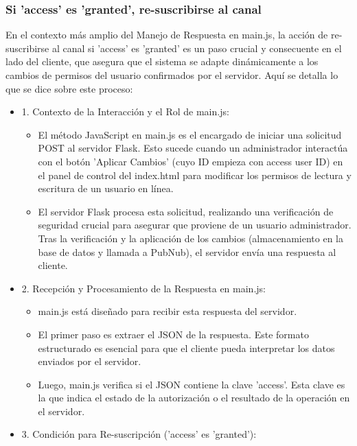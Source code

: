 \documentclass{report}
\begin{document}
\subsubsection{Si 'access' es 'granted', re-suscribirse al canal}
En el contexto más amplio del Manejo de Respuesta en main.js, la acción de re-suscribirse al canal si 'access' es 'granted' es un paso crucial y 
consecuente en el lado del cliente, que asegura que el sistema se adapte dinámicamente a los cambios de permisos del usuario confirmados por el servidor.
Aquí se detalla lo que se dice sobre este proceso:
\begin{itemize}
    \item 1. Contexto de la Interacción y el Rol de main.js:
        \begin{itemize}
            \item El método JavaScript en main.js es el encargado de iniciar una solicitud POST al servidor Flask. Esto sucede cuando un 
            administrador interactúa con el botón 'Aplicar Cambios' (cuyo ID empieza con access user ID) en el panel de control del index.html 
            para modificar los permisos de lectura y escritura de un usuario en línea.
            \item El servidor Flask procesa esta solicitud, realizando una verificación de seguridad crucial para asegurar que proviene de un 
            usuario administrador. Tras la verificación y la aplicación de los cambios (almacenamiento en la base de datos y llamada a PubNub), 
            el servidor envía una respuesta al cliente.
        \end{itemize}
    \item 2. Recepción y Procesamiento de la Respuesta en main.js:
        \begin{itemize}
            \item main.js está diseñado para recibir esta respuesta del servidor.
            \item El primer paso es extraer el JSON de la respuesta. Este formato estructurado es esencial para que el cliente pueda interpretar 
            los datos enviados por el servidor.
            \item Luego, main.js verifica si el JSON contiene la clave 'access'. Esta clave es la que indica el estado de la autorización o el 
            resultado de la operación en el servidor.
        \end{itemize}
    \item 3. Condición para Re-suscripción ('access' es 'granted'):

\end{itemize}
\end{document}
